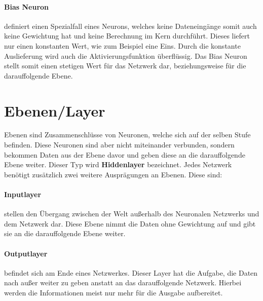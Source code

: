 
\paragraph{Bias Neuron} 
\label{sec:Bias Neuron}
definiert einen Spezialfall eines Neurons, welches keine Dateneingänge somit auch keine Gewichtung hat und keine Berechnung im Kern durchführt. 
Dieses liefert nur einen konstanten Wert, wie zum Beispiel eine Eins. 
Durch die konstante Auslieferung wird auch die Aktivierungsfunktion überflüssig. 
Das Bias Neuron stellt somit einen stetigen Wert für das Netzwerk dar, beziehungsweise für die darauffolgende Ebene.

\section{Ebenen/Layer}
\label{sec:Layer}

Ebenen sind Zusammenschlüsse von Neuronen, welche sich auf der selben Stufe befinden. 
Diese Neuronen sind aber nicht miteinander verbunden, sondern bekommen Daten aus der Ebene davor und geben diese an die darauffolgende Ebene weiter. 
Dieser Typ wird \textbf{Hiddenlayer} bezeichnet. 
Jedes Netzwerk benötigt zusätzlich zwei weitere Ausprägungen an Ebenen. 
Diese sind:

\paragraph{Inputlayer} stellen den Übergang zwischen der Welt außerhalb des Neuronalen Netzwerks und dem Netzwerk dar.
Diese Ebene nimmt die Daten ohne Gewichtung auf und gibt sie an die darauffolgende Ebene weiter. 

\paragraph{Outputlayer} befindet sich am Ende eines Netzwerkes. 
Dieser Layer hat die Aufgabe, die Daten nach außer weiter zu geben anstatt an das darauffolgende Netzwerk. 
Hierbei werden die Informationen meist nur mehr für die Ausgabe aufbereitet. 
\\

